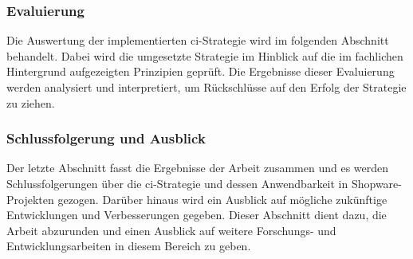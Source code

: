 \subsubsection{Evaluierung}

Die Auswertung der implementierten \acrshort{ci}-Strategie wird im folgenden Abschnitt behandelt.
Dabei wird die umgesetzte Strategie im Hinblick auf die im fachlichen Hintergrund aufgezeigten Prinzipien
geprüft.
Die Ergebnisse dieser Evaluierung werden analysiert und interpretiert, um Rückschlüsse auf den Erfolg der
Strategie zu ziehen.

\subsubsection{Schlussfolgerung und Ausblick}

Der letzte Abschnitt fasst die Ergebnisse der Arbeit zusammen und es werden Schlussfolgerungen über die
\acrshort{ci}-Strategie und dessen Anwendbarkeit in Shopware-Projekten gezogen.
Darüber hinaus wird ein Ausblick auf mögliche zukünftige Entwicklungen und Verbesserungen gegeben.
Dieser Abschnitt dient dazu, die Arbeit abzurunden und einen Ausblick auf weitere Forschungs- und
Entwicklungsarbeiten in diesem Bereich zu geben.

\clearpage
